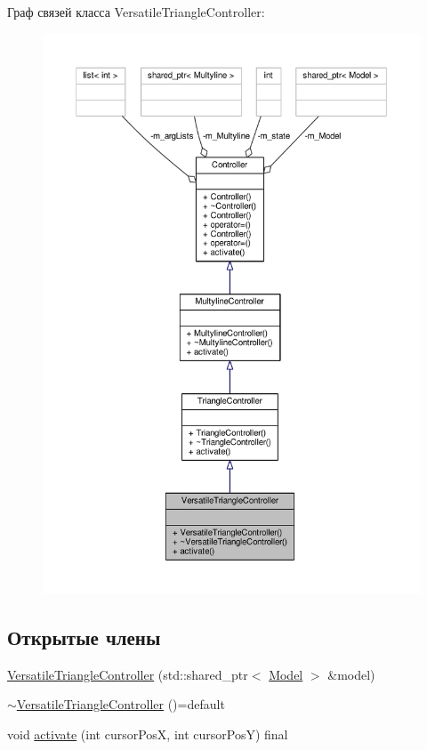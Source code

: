 Граф связей класса Versatile\-Triangle\-Controller\-:
\nopagebreak
\begin{figure}[H]
\begin{center}
\leavevmode
\includegraphics[width=350pt]{class_versatile_triangle_controller__coll__graph}
\end{center}
\end{figure}
\subsection*{Открытые члены}
\begin{DoxyCompactItemize}
\item 
\hyperlink{class_versatile_triangle_controller_a56d71d54f87562a6bef7978293e681e1}{Versatile\-Triangle\-Controller} (std\-::shared\-\_\-ptr$<$ \hyperlink{class_model}{Model} $>$ \&model)
\item 
\hyperlink{class_versatile_triangle_controller_aed1703ed1565b8693a896e044be4475e}{$\sim$\-Versatile\-Triangle\-Controller} ()=default
\item 
void \hyperlink{class_versatile_triangle_controller_a0d553f2393114a789f3e3964b97dad66}{activate} (int cursor\-Pos\-X, int cursor\-Pos\-Y) final
\end{DoxyCompactItemize}


